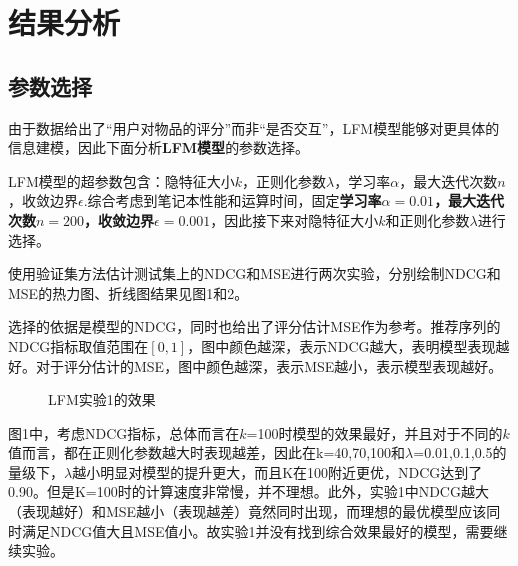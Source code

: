 \documentclass[12pt, a4paper]{ctexart}
\begin{document}
\section{结果分析}

\subsection{参数选择}

由于数据给出了“用户对物品的评分”而非“是否交互”，LFM模型能够对更具体的信息建模，因此下面分析\textbf{LFM模型}的参数选择。

LFM模型的超参数包含：隐特征大小$k$，正则化参数$\lambda$，学习率$\alpha$，最大迭代次数$n$，收敛边界$\epsilon$.综合考虑到笔记本性能和运算时间，固定\textbf{学习率$\alpha=0.01$，最大迭代次数$n=200$，收敛边界$\epsilon=0.001$}，因此接下来对隐特征大小$k$和正则化参数$\lambda$进行选择。

使用验证集方法估计测试集上的NDCG和MSE进行两次实验，分别绘制NDCG和MSE的热力图、折线图结果见图1和2。

选择的依据是模型的NDCG，同时也给出了评分估计MSE作为参考。推荐序列的NDCG指标取值范围在$[0,1]$，图中颜色越深，表示NDCG越大，表明模型表现越好。对于评分估计的MSE，图中颜色越深，表示MSE越小，表示模型表现越好。

\begin{figure}[H] %
    \centering  %
    \vspace{-0.35cm} %
    \subfigtopskip=2pt %
    \subfigbottomskip=2pt %
    \subfigcapskip=-5pt %
    \quad %
    \quad
    \caption{LFM实验1的效果}
    \label{level}
 \end{figure}

图1中，考虑NDCG指标，总体而言在$k$=100时模型的效果最好，并且对于不同的$k$值而言，都在正则化参数越大时表现越差，因此在k=40,70,100和$\lambda$=0.01,0.1,0.5的量级下，$\lambda$越小明显对模型的提升更大，而且K在100附近更优，NDCG达到了0.90。但是K=100时的计算速度非常慢，并不理想。此外，实验1中NDCG越大（表现越好）和MSE越小（表现越差）竟然同时出现，而理想的最优模型应该同时满足NDCG值大且MSE值小。故实验1并没有找到综合效果最好的模型，需要继续实验。
\end{document}
